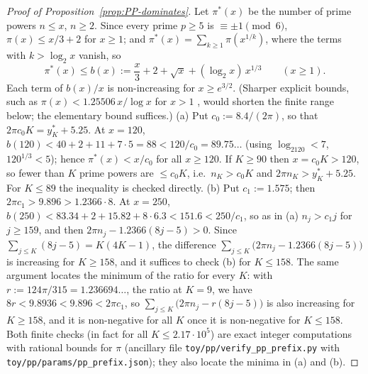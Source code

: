 \begin{proof}[Proof of Proposition~\textup{\ref{prop:PP-dominates}}]
Let $\pi^*(x)$ be the number of prime powers $n\le x$, $n\ge2$. Since every prime $p\ge5$ is $\equiv\pm1\pmod 6$,
$\pi(x)\le x/3+2$ for $x\ge1$; and $\pi^*(x)=\sum_{k\ge1}\pi(x^{1/k})$, where the terms with $k>\log_2x$ vanish, so
\[
  \pi^*(x)\le b(x):=\frac x3+2+\sqrt x+(\log_2x)\,x^{1/3}\qquad(x\ge1).
\]
Each term of $b(x)/x$ is non-increasing for $x\ge e^{3/2}$. (Sharper explicit bounds, such as
$\pi(x)<1.25506\,x/\log x$ for $x>1$ \cite[(3.6)]{RS62}, would shorten the finite range below; the elementary bound
suffices.) (a) Put $c_0:=8.4/(2\pi)$, so that $2\pi c_0K=y^*_K+5.25$.
At $x=120$, $b(120)<40+2+11+7\cdot5=88<120/c_0=89.75\ldots$ (using $\log_2120<7$, $120^{1/3}<5$); hence $\pi^*(x)<x/c_0$
for all $x\ge120$. If $K\ge90$ then $x=c_0K>120$, so fewer than $K$ prime powers are $\le c_0K$, i.e.\ $n_K>c_0K$ and
$2\pi n_K>y^*_K+5.25$. For $K\le89$ the inequality is checked directly. (b) Put $c_1:=1.575$; then
$2\pi c_1>9.896>1.2366\cdot8$. At $x=250$, $b(250)<83.34+2+15.82+8\cdot6.3<151.6<250/c_1$, so as in (a)
$n_j>c_1j$ for $j\ge159$, and then $2\pi n_j-1.2366(8j-5)>0$. Since
$\sum_{j\le K}(8j-5)=K(4K-1)$, the difference $\sum_{j\le K}\bigl(2\pi n_j-1.2366(8j-5)\bigr)$ is increasing for
$K\ge158$, and it suffices to check (b) for $K\le158$. The same argument locates the minimum of the ratio for every $K$:
with $r:=124\pi/315=1.236694\ldots$, the ratio at $K=9$, we have $8r<9.8936<9.896<2\pi c_1$, so
$\sum_{j\le K}\bigl(2\pi n_j-r(8j-5)\bigr)$ is also increasing for $K\ge158$, and it is non-negative for all $K$ once it is
non-negative for $K\le158$. Both finite checks (in fact for all $K\le2.17\cdot10^5$) are
exact integer computations with rational bounds for $\pi$
\textup{(}ancillary file \nolinkurl{toy/pp/verify_pp_prefix.py} with \nolinkurl{toy/pp/params/pp_prefix.json}\textup{)}; they
also locate the minima in (a) and (b).
\end{proof}

